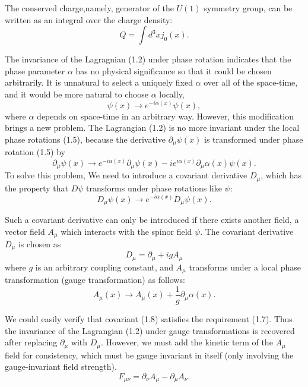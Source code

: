 The conserved charge,namely, generator of the $U(1)$ symmetry group, can be written as an integral over the charge density:
\begin{equation}
Q=\int d^3 x j_0(x).
\end{equation}

The invariance of the Lagragnian (1.2) under phase rotation indicates that the phase parameter $\alpha$ has no physical significance so that it could be chosen arbitrarily. It is unnatural to select a uniquely fixed $\alpha$ over all of the space-time, and it would be more natural to choose $\alpha$ locally, 
\begin{equation}
\psi(x)\to e^{-i\alpha(x)}\psi(x),
\end{equation}
where $\alpha$ depends on space-time in an arbitrary way. However, this modification brings a new problem. The Lagrangian (1.2) is no more invariant under the local phase rotations (1.5), because the derivative $\partial_\mu\psi(x)$ is transformed under phase rotation (1.5) by
\begin{equation}
\partial_\mu \psi(x)\to e^{-i\alpha(x)}\partial_\mu \psi(x)-ie^{i\alpha(x)}\partial_\mu\alpha(x)\psi(x).
\end{equation}
To solve this problem, We need to introduce a covariant derivative $D_\mu$, which has the property that $D\psi$ transforms under phase rotations like $\psi$:
\begin{equation}
D_\mu\psi(x)\to e^{-i\alpha(x)}D_\mu\psi(x).
\end{equation}

Such a covariant derivative can only be introduced if there exists another field, a vector field $A_\mu$ which interacts with the spinor field $\psi$. The covariant derivative $D_\mu$ is chosen as 
\begin{equation}
D_\mu=\partial_\mu + igA_\mu
\end{equation}
where $g$ is an arbitrary coupling constant, and $A_\mu$ transforms under a local phase transformation (gauge transformation) as follows:
\begin{equation}
A_\mu(x)\to A_\mu (x)+\frac{1}{g}\partial_\mu\alpha(x).
\end{equation}

We could easily verify that covariant (1.8) satisfies the requirement (1.7). Thus the invariance of the Lagrangian (1.2) under gauge transformations is recovered after replacing $\partial_\mu$ with $D_\mu$. However, we must add the kinetic term of the $A_\mu$ field for consistency, which must be gauge invariant in itself (only involving the gauge-invariant field strength).
\begin{equation}
F_{\mu\nu}=\partial_\nu A_\mu -\partial_\mu A_\nu.
\end{equation}

